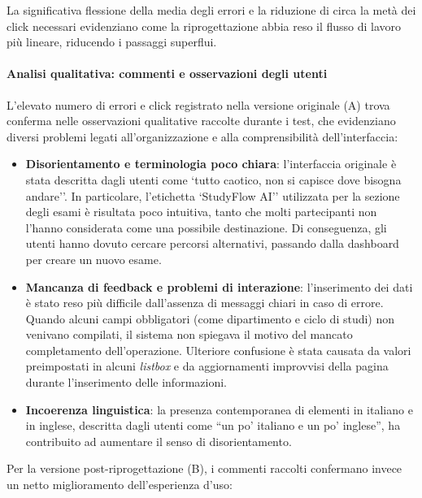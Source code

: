 La significativa flessione della media degli errori e la riduzione di circa la metà dei click necessari evidenziano come la riprogettazione abbia reso il flusso di lavoro più lineare, riducendo i passaggi superflui.

\paragraph{Analisi qualitativa: commenti e osservazioni degli utenti}

L'elevato numero di errori e click registrato nella versione originale (A) trova conferma nelle osservazioni qualitative raccolte durante i test, che evidenziano diversi problemi legati all'organizzazione e alla comprensibilità dell'interfaccia:

\begin{itemize}
	\item \textbf{Disorientamento e terminologia poco chiara}: l'interfaccia originale è stata descritta dagli utenti come `tutto caotico, non si capisce dove bisogna andare''. In particolare, l'etichetta `StudyFlow AI'' utilizzata per la sezione degli esami è risultata poco intuitiva, tanto che molti partecipanti non l'hanno considerata come una possibile destinazione. Di conseguenza, gli utenti hanno dovuto cercare percorsi alternativi, passando dalla dashboard per creare un nuovo esame.


	\item \textbf{Mancanza di feedback e problemi di interazione}: l'inserimento dei dati è stato reso più difficile dall'assenza di messaggi chiari in caso di errore. Quando alcuni campi obbligatori (come dipartimento e ciclo di studi) non venivano compilati, il sistema non spiegava il motivo del mancato completamento dell'operazione. Ulteriore confusione è stata causata da valori preimpostati in alcuni \textit{listbox} e da aggiornamenti improvvisi della pagina durante l'inserimento delle informazioni.

	\item \textbf{Incoerenza linguistica}: la presenza contemporanea di elementi in italiano e in inglese, descritta dagli utenti come ``un po' italiano e un po' inglese'', ha contribuito ad aumentare il senso di disorientamento.
\end{itemize}

Per la versione post-riprogettazione (B), i commenti raccolti confermano invece un netto miglioramento dell'esperienza d'uso:

